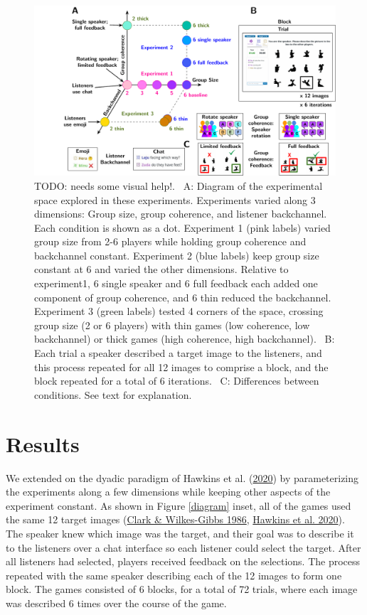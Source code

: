 \documentclass[
  english,
  a4paper,
]{article}
\begin{document}
\begin{figure}[t!]

{\centering \includegraphics[width=1\linewidth]{expt-diagram} 

}

\caption{TODO: needs some visual help!. \ A: Diagram of the experimental space explored in these experiments. Experiments varied along 3 dimensions: Group size, group coherence, and listener backchannel. Each condition is shown as a dot. Experiment 1 (pink labels) varied group size from 2-6 players while holding group coherence and backchannel constant. Experiment 2 (blue labels) keep group size constant at 6 and varied the other dimensions. Relative to experiment1, 6 single speaker and 6 full feedback each added one component of group coherence, and 6 thin reduced the backchannel. Experiment 3 (green labels) tested 4 corners of the space, crossing group size (2 or 6 players) with thin games (low coherence, low backchannel) or thick games (high coherence, high backchannel). \  B: Each trial a speaker described a target image to the listeners, and this process repeated for all 12 images to comprise a block, and the block repeated for a total of 6 iterations. \ C: Differences between conditions. See text for explanation.}\label{fig:diagram}
\end{figure}

\hypertarget{results}{%
\section{Results}\label{results}}

We extended on the dyadic paradigm of Hawkins et al. (\protect\hyperlink{ref-hawkinsCharacterizingDynamicsLearning2020}{2020}) by parameterizing the experiments along a few dimensions while keeping other aspects of the experiment constant. As shown in Figure \ref{diagram} inset, all of the games used the same 12 target images (\protect\hyperlink{ref-clarkReferringCollaborativeProcess1986}{Clark \& Wilkes-Gibbs 1986}, \protect\hyperlink{ref-hawkinsCharacterizingDynamicsLearning2020}{Hawkins et al. 2020}). The speaker knew which image was the target, and their goal was to describe it to the listeners over a chat interface so each listener could select the target. After all listeners had selected, players received feedback on the selections. The process repeated with the same speaker describing each of the 12 images to form one block. The games consisted of 6 blocks, for a total of 72 trials, where each image was described 6 times over the course of the game.
\end{document}
